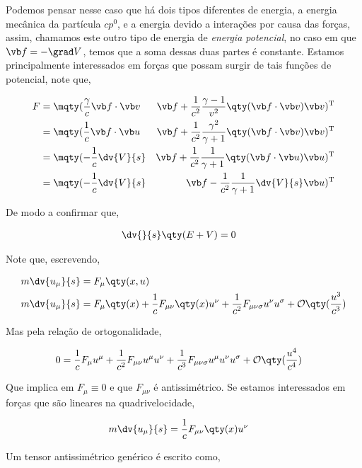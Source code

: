 \documentclass[twoside]{amsart}
\numberwithin{equation}{section}
\begin{document}
Podemos pensar nesse caso que há dois tipos diferentes de energia, a energia mecânica da partícula $cp^0$, e a energia devido a interações por causa das forças, assim, chamamos este outro tipo de energia de \emph{energia potencial}, no caso em que $\vb f=-\grad V$, temos que a soma dessas duas partes é constante. Estamos principalmente interessados em forças que possam surgir de tais funções de potencial, note que,

\begin{align}
    F&=\mqty(\frac\gamma c\vb f\cdot \vb v&\vb f+\frac{1}{c^2}\frac{\gamma -1}{v^2}\qty(\vb f\cdot \vb v)\vb v)^{\textup T}\\
    &=\mqty(\frac1c\vb f\cdot \vb u&\vb f+\frac{1}{c^2}\frac{\gamma^2}{\gamma+1}\qty(\vb f\cdot \vb v)\vb v)^{\textup T}\\
    &=\mqty(-\frac1c\dv{V}{s}&\vb f+\frac{1}{c^2}\frac{1}{\gamma+1}\qty(\vb f\cdot\vb u)\vb u)^{\textup T}\\
    &=\mqty(-\frac1c\dv{V}{s}&\vb f-\frac{1}{c^2}\frac{1}{\gamma+1}\dv{V}{s}\vb u)^{\textup T}
\end{align}

De modo a confirmar que,

\begin{align}
    \dv{}{s}\qty(E+V)&=0
\end{align}

Note que, escrevendo,

\begin{align}
    m\dv{u_\mu}{s}&=F_{\mu}\qty(x,u)\\
    m\dv{u_\mu}{s}&=F_{\mu}\qty(x)+\frac1cF_{\mu \nu}\qty(x)u^\nu+\frac{1}{c^2}F_{\mu\nu\sigma}u^\nu u^\sigma+\mathcal O\qty(\frac{u^3}{c^3})
\end{align}

Mas pela relação de ortogonalidade,

\begin{align}
    0&=\frac1cF_{\mu}u^\mu+\frac{1}{c^2}F_{\mu\nu}u^\mu u^\nu+\frac{1}{c^3}F_{\mu\nu\sigma}u^\mu u^\nu u^\sigma+\mathcal O\qty(\frac{u^4}{c^4})
\end{align}

Que implica em $F_\mu\equiv0$ e que $F_{\mu\nu}$ é antissimétrico. Se estamos interessados em forças que são lineares na quadrivelocidade,

\begin{align}
    m\dv{u_\mu}{s}&=\frac1cF_{\mu\nu}\qty(x)u^\nu
\end{align}

Um tensor antissimétrico genérico é escrito como,
\end{document}
